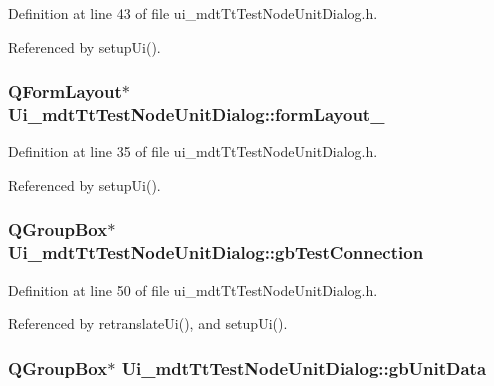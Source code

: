 Definition at line 43 of file ui\-\_\-mdt\-Tt\-Test\-Node\-Unit\-Dialog.\-h.



Referenced by setup\-Ui().

\hypertarget{class_ui__mdt_tt_test_node_unit_dialog_affa5f0b7adb616181879c18a3a3517ad}{
\subsubsection[{form\-Layout\-\_\-3}]{\setlength{\rightskip}{0pt plus 5cm}Q\-Form\-Layout$\ast$ Ui\-\_\-mdt\-Tt\-Test\-Node\-Unit\-Dialog\-::form\-Layout\-\_}}\label{class_ui__mdt_tt_test_node_unit_dialog_affa5f0b7adb616181879c18a3a3517ad}


Definition at line 35 of file ui\-\_\-mdt\-Tt\-Test\-Node\-Unit\-Dialog.\-h.



Referenced by setup\-Ui().

\hypertarget{class_ui__mdt_tt_test_node_unit_dialog_a52009f8a3ce093700f617b32e0b7365a}{
\subsubsection[{gb\-Test\-Connection}]{\setlength{\rightskip}{0pt plus 5cm}Q\-Group\-Box$\ast$ Ui\-\_\-mdt\-Tt\-Test\-Node\-Unit\-Dialog\-::gb\-Test\-Connection}}\label{class_ui__mdt_tt_test_node_unit_dialog_a52009f8a3ce093700f617b32e0b7365a}


Definition at line 50 of file ui\-\_\-mdt\-Tt\-Test\-Node\-Unit\-Dialog.\-h.



Referenced by retranslate\-Ui(), and setup\-Ui().

\hypertarget{class_ui__mdt_tt_test_node_unit_dialog_a466a0f578df6cfa0bb49703bd76ecf2e}{
\subsubsection[{gb\-Unit\-Data}]{\setlength{\rightskip}{0pt plus 5cm}Q\-Group\-Box$\ast$ Ui\-\_\-mdt\-Tt\-Test\-Node\-Unit\-Dialog\-::gb\-Unit\-Data}}\label{class_ui__mdt_tt_test_node_unit_dialog_a466a0f578df6cfa0bb49703bd76ecf2e}


